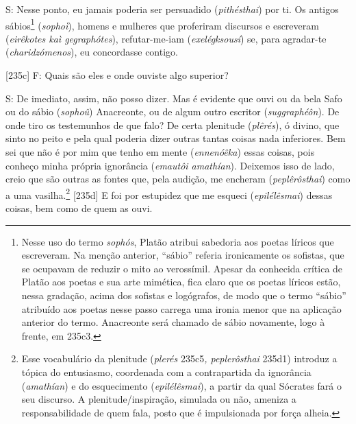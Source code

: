 S: Nesse ponto, eu jamais poderia ser persuadido (\emph{pithésthai}) por
ti. Os antigos sábios\footnote{Nesse uso do termo \emph{sophós}, Platão
  atribui sabedoria aos poetas líricos que escreveram. Na menção
  anterior, ``sábio'' referia ironicamente os sofistas, que se ocupavam
  de reduzir o mito ao verossímil. Apesar da conhecida crítica de Platão
  aos poetas e sua arte mimética, fica claro que os poetas líricos
  estão, nessa gradação, acima dos sofistas e logógrafos, de modo que o
  termo ``sábio'' atribuído aos poetas nesse passo carrega uma ironia
  menor que na aplicação anterior do termo. Anacreonte será chamado de
  sábio novamente, logo à frente, em 235c3.} (\emph{sophoì}), homens e
mulheres que proferiram discursos e escreveram (\emph{eirêkotes kaì
gegraphótes}), refutar-me-iam (\emph{exelégksousí}) se, para agradar-te
(\emph{charidzómenos}), eu concordasse contigo.

{[}235c{]} F: Quais são eles e onde ouviste algo superior?

S: De imediato, assim, não posso dizer. Mas é evidente que ouvi ou da
bela Safo ou do sábio (\emph{sophoû}) Anacreonte, ou de algum outro
escritor (\emph{suggraphéôn}). De onde tiro os testemunhos de que falo?
De certa plenitude (\emph{plêrés}), ó divino, que sinto no peito e pela
qual poderia dizer outras tantas coisas nada inferiores. Bem sei que não
é por mim que tenho em mente (\emph{ennenóêka}) essas coisas, pois
conheço minha própria ignorância (\emph{emautôi amathían}). Deixemos
isso de lado, creio que são outras as fontes que, pela audição, me
encheram (\emph{peplêrôsthai}) como a uma vasilha.\footnote{Esse
  vocabulário da plenitude (\emph{plerés} 235c5\emph{, peplerôsthai}
  235d1) introduz a tópica do entusiasmo, coordenada com a contrapartida
  da ignorância (\emph{amathían}) e do esquecimento
  (\emph{epilélêsmai}), a partir da qual Sócrates fará o seu discurso. A
  plenitude/inspiração, simulada ou não, ameniza a responsabilidade de
  quem fala, posto que é impulsionada por força alheia.} {[}235d{]} E
foi por estupidez que me esqueci (\emph{epilélêsmai}) dessas coisas, bem
como de quem as ouvi.

